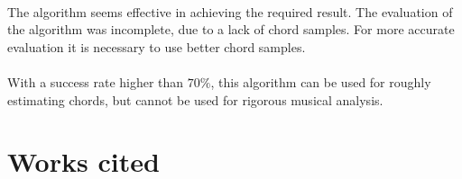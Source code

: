 \documentclass{article}
\begin{document}
\paragraph*{}
The algorithm seems effective in achieving the required result. The evaluation 
of the algorithm was incomplete, due to a lack of chord samples. For more 
accurate evaluation it is necessary to use better chord samples.

\paragraph*{}
With a success rate higher than $70\%$, this algorithm can be used for roughly
estimating chords, but cannot be used for rigorous musical analysis.

\clearpage
\pagebreak
{}
\section*{Works cited}
\end{document}
